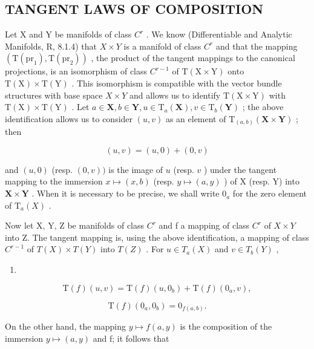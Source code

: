\subsection{TANGENT LAWS OF COMPOSITION}

Let X and Y be manifolds of class \(C^{r}\) . We know (Differentiable and Analytic Manifolds, R, 8.1.4) that \(X \times Y\) is a manifold of class \(C^{r}\) and that the mapping \((\mathrm{T}(\mathrm{pr}_{1}), \mathrm{T}(\mathrm{pr}_{2}))\) , the product of the tangent mappings to the canonical projections, is an isomorphism of class \(C^{r-1}\) of \(\mathrm{T}(\mathrm{X} \times \mathrm{Y})\) onto \(\mathrm{T}(\mathrm{X}) \times \mathrm{T}(\mathrm{Y})\) . This isomorphism is compatible with the vector bundle structures with base space \(X \times Y\) and allows us to identify \(\mathrm{T}(\mathrm{X} \times \mathrm{Y})\) with \(\mathrm{T}(\mathrm{X}) \times \mathrm{T}(\mathrm{Y})\) . Let \(a \in \mathbf{X}, b \in \mathbf{Y}, u \in \mathrm{T}_a(\mathbf{X}), v \in \mathrm{T}_b(\mathbf{Y})\) ; the above identification allows us to consider \((u, v)\) as an element of \(\mathrm{T}_{(a,b)}(\mathbf{X} \times \mathbf{Y})\) ; then

\[
(u, v) = (u, 0) + (0, v)
\]

and \((u,0)\) (resp. \((0,v))\) is the image of \(u\) (resp. \(v\) ) under the tangent mapping to the immersion \(x\mapsto (x,b)\) (resp. \(y\mapsto (a,y)\) ) of X (resp. Y) into \(\mathbf{X}\times \mathbf{Y}\) . When it is necessary to be precise, we shall write \(0_{a}\) for the zero element of \(\mathrm{T}_a(X)\) .

Now let X, Y, Z be manifolds of class \(C^{r}\) and f a mapping of class \(C^{r}\) of \(X \times Y\) into Z. The tangent mapping is, using the above identification, a mapping of class \(C^{r-1}\) of \(T(X) \times T(Y)\) into \(T(Z)\) . For \(u \in T_{a}(X)\) and \(v \in T_{b}(Y)\) ,

\begin{enumerate}
\def\labelenumi{(\arabic{enumi})}
\tightlist
\item
\end{enumerate}

\[
\mathrm{T} (f) (u, v) = \mathrm{T} (f) (u, 0 _ {b}) + \mathrm{T} (f) (0 _ {a}, v),
\]

\[
\mathrm{T} (f) \left(0 _ {a}, 0 _ {b}\right) = 0 _ {f (a, b)}.\tag{2}
\]

On the other hand, the mapping \(y \mapsto f(a, y)\) is the composition of the immersion \(y \mapsto (a, y)\) and f; it follows that

